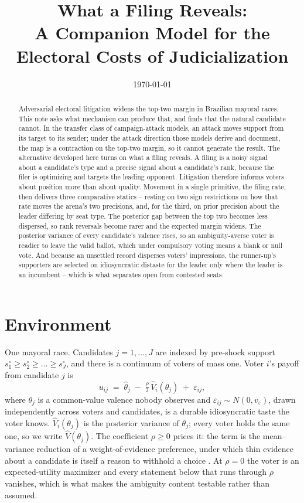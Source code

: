 \documentclass[11pt]{article}
\title{What a Filing Reveals:\\ A Companion Model for the Electoral Costs of
Judicialization}
\author{}
\date{\today}
\theoremstyle{definition}
\theoremstyle{remark}
\begin{document}
\maketitle

\begin{abstract}
\noindent
Adversarial electoral litigation widens the top-two margin in Brazilian
mayoral races. This note asks what mechanism can produce that, and finds that
the natural candidate cannot. In the transfer class of campaign-attack models,
an attack moves support from its target to its sender; under the attack
direction those models derive and document, the map is a contraction on the
top-two margin, so it cannot generate the result. The alternative developed
here turns on what a filing reveals. A filing is a noisy signal about a
candidate's type and a precise signal about a candidate's rank, because the
filer is optimizing and targets the leading opponent. Litigation therefore
informs voters about position more than about quality. Movement in a single
primitive, the filing rate, then delivers three comparative statics -- resting
on two sign restrictions on how that rate moves the arena's two precisions,
and, for the third, on prior precision about the leader differing by seat
type. The posterior gap between the top two
becomes less dispersed, so rank reversals become rarer and the expected margin
widens. The posterior variance of every candidate's valence rises, so an
ambiguity-averse voter is readier to leave the valid ballot, which under
compulsory voting means a blank or null vote. And because an unsettled record
disperses voters' impressions, the runner-up's supporters are selected on
idiosyncratic distaste for the leader only where the leader is an incumbent --
which is what separates open from contested seats.
\end{abstract}

\section{Environment}
\label{sec:env}

One mayoral race. Candidates $j = 1,\dots,J$ are indexed by pre-shock support
$s^\circ_1 \ge s^\circ_2 \ge \dots \ge s^\circ_J$, and there is a continuum of
voters of mass one. Voter $i$'s payoff from candidate $j$ is
\[
  u_{ij} \;=\; \hat\theta_j \;-\; \tfrac{\rho}{2}\,\hat V_i(\theta_j)
          \;+\; \varepsilon_{ij},
\]
where $\theta_j$ is a common-value valence nobody observes and
$\varepsilon_{ij} \sim N(0, v_\varepsilon)$, drawn independently across voters
and candidates, is a durable idiosyncratic taste the voter knows.
$\hat V_i(\theta_j)$ is the posterior variance of $\theta_j$; every voter holds
the same one, so we write $\hat V(\theta_j)$. The coefficient $\rho \ge 0$
prices it: the term is the mean--variance reduction of a weight-of-evidence
preference, under which thin evidence about a candidate is itself a reason to
withhold a choice \citep{ghirardato2006}. At $\rho = 0$ the voter is an
expected-utility maximizer and every statement below that runs through $\rho$
vanishes, which is what makes the ambiguity content testable rather than
assumed.
\end{document}

